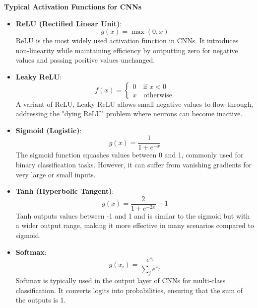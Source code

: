 \textbf{Typical Activation Functions for CNNs}

\begin{itemize}
    \item \textbf{ReLU (Rectified Linear Unit)}: \label{theoretical_activations_relu}
    \begin{equation}
    g(x) = \max(0, x)
    \end{equation}
    ReLU is the most widely used activation function in CNNs. It introduces non-linearity while maintaining efficiency by outputting zero for negative values and passing positive values unchanged.

    \item \textbf{Leaky ReLU}: \label{theoretical_activations_leakyrelu}
    \begin{equation}
        f(x) =
        \begin{cases}
        0 \quad \text{if } x < 0 \\
        x \quad \text{otherwise}
        \end{cases}
    \end{equation}
    A variant of ReLU, Leaky ReLU allows small negative values to flow through, addressing the "dying ReLU" problem where neurons can become inactive.

    \item \textbf{Sigmoid (Logistic)}:  \label{theoretical_activations_sigmoid}
    \begin{equation}
        g(x) = \frac{1}{1 + e^{-x}}
    \end{equation}
    The sigmoid function squashes values between 0 and 1, commonly used for binary classification tasks. However, it can suffer from vanishing gradients for very large or small inputs.

    \item \textbf{Tanh (Hyperbolic Tangent)}:  \label{theoretical_activations_tanh}
    \begin{equation}
        g(x) = \frac{2}{1 + e^{-2x}} - 1
    \end{equation}
    Tanh outputs values between -1 and 1 and is similar to the sigmoid but with a wider output range, making it more effective in many scenarios compared to sigmoid.

    \item \textbf{Softmax}: \label{theoretical_activations_softmax}
    \begin{equation}
        g(x_i) = \frac{e^{x_i}}{\sum_{j} e^{x_j}}
    \end{equation}
    Softmax is typically used in the output layer of CNNs for multi-class classification. It converts logits into probabilities, ensuring that the sum of the outputs is 1.


\end{itemize}
